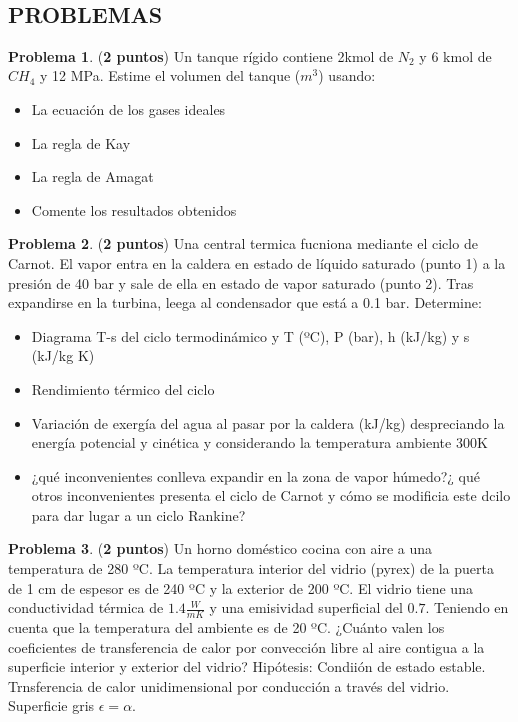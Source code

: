 \documentclass[8pt]{article}
\begin{document}
\\

\subsection{PROBLEMAS}
\textbf{Problema 1}. (\textbf{2 puntos}) Un tanque rígido contiene 2kmol de $N _{2}$ y 6 kmol de $CH _{4}$ y 12 MPa. Estime el volumen del tanque ($m ^{3}$) usando:
\begin{itemize}
    \item La ecuación de los gases ideales
    \item La regla de Kay
    \item La regla de Amagat
    \item Comente los resultados obtenidos
\end{itemize}

\textbf{Problema 2}. (\textbf{2 puntos}) Una central termica fucniona mediante el ciclo de Carnot. El vapor entra en la caldera en estado de líquido saturado (punto 1) a la presión de 40 bar y sale de ella en estado de vapor saturado (punto 2). Tras expandirse en la turbina, leega al condensador que está a 0.1 bar. Determine:
\begin{itemize}
    \item Diagrama T-s del ciclo termodinámico y T (ºC), P (bar), h (kJ/kg) y s (kJ/kg K)
    \item Rendimiento térmico del ciclo
    \item Variación de exergía del agua al pasar por la caldera (kJ/kg) despreciando la energía potencial y cinética y considerando la temperatura ambiente 300K
    \item ¿qué inconvenientes conlleva expandir en la zona de vapor húmedo?¿ qué otros inconvenientes presenta el ciclo de Carnot y cómo se modificia este dcilo para dar lugar a un ciclo Rankine?
\end{itemize}

\textbf{Problema 3}. (\textbf{2 puntos}) Un horno doméstico cocina con aire a una temperatura de 280 ºC. La temperatura interior del vidrio (pyrex) de la puerta de 1 cm de espesor es de 240 ºC y la exterior de 200 ºC. El vidrio tiene una conductividad térmica de $1.4 \frac{W}{m K}$ y una emisividad superficial del $0.7$. Teniendo en cuenta que la temperatura del ambiente es de 20 ºC. ¿Cuánto valen los coeficientes de transferencia de calor por convección libre al aire contigua a la superficie interior y exterior del vidrio?
Hipótesis: Condiión de estado estable. Trnsferencia de calor unidimensional por conducción a través del vidrio. Superficie gris $\epsilon = \alpha$.
\end{document}
